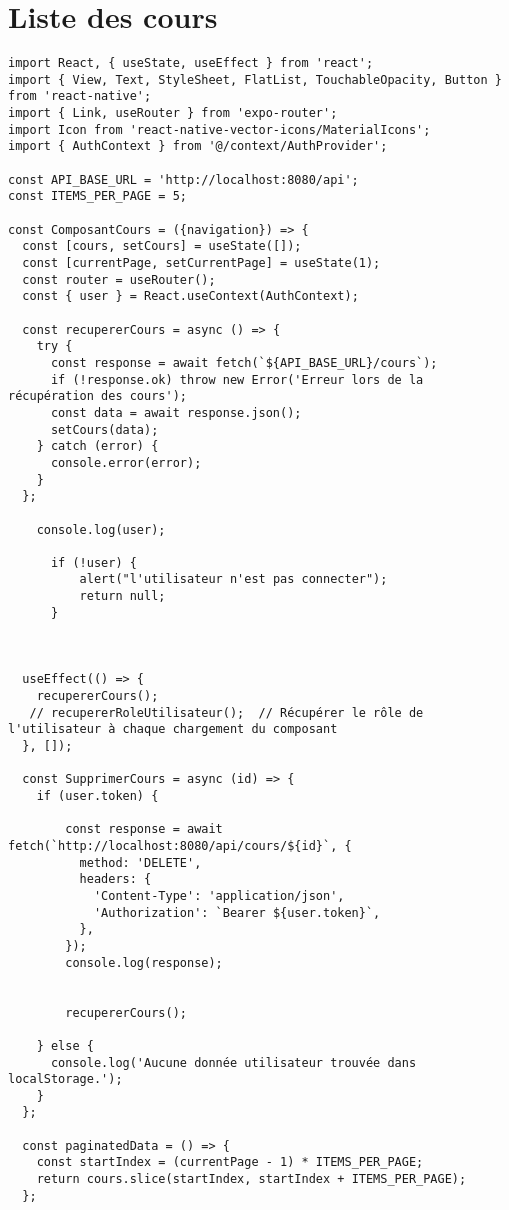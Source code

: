 \documentclass[10pt,a4paper]{article}
\begin{document}
\section{Liste des cours}
\begin{verbatim}
import React, { useState, useEffect } from 'react';
import { View, Text, StyleSheet, FlatList, TouchableOpacity, Button } from 'react-native';
import { Link, useRouter } from 'expo-router';
import Icon from 'react-native-vector-icons/MaterialIcons';
import { AuthContext } from '@/context/AuthProvider';

const API_BASE_URL = 'http://localhost:8080/api';
const ITEMS_PER_PAGE = 5;

const ComposantCours = ({navigation}) => {
  const [cours, setCours] = useState([]);
  const [currentPage, setCurrentPage] = useState(1);
  const router = useRouter();
  const { user } = React.useContext(AuthContext);

  const recupererCours = async () => {
    try {
      const response = await fetch(`${API_BASE_URL}/cours`);
      if (!response.ok) throw new Error('Erreur lors de la récupération des cours');
      const data = await response.json();
      setCours(data);
    } catch (error) {
      console.error(error);
    }
  };

    console.log(user);
    
      if (!user) {
          alert("l'utilisateur n'est pas connecter");
          return null;
      }
    
  

  useEffect(() => {
    recupererCours();
   // recupererRoleUtilisateur();  // Récupérer le rôle de l'utilisateur à chaque chargement du composant
  }, []);

  const SupprimerCours = async (id) => {
    if (user.token) {
     
        const response = await fetch(`http://localhost:8080/api/cours/${id}`, {
          method: 'DELETE',
          headers: {
            'Content-Type': 'application/json',
            'Authorization': `Bearer ${user.token}`,
          },
        });
        console.log(response);
        
        
        recupererCours();
     
    } else {
      console.log('Aucune donnée utilisateur trouvée dans localStorage.');
    }
  };

  const paginatedData = () => {
    const startIndex = (currentPage - 1) * ITEMS_PER_PAGE;
    return cours.slice(startIndex, startIndex + ITEMS_PER_PAGE);
  };


\end{verbatim}
\end{document}
